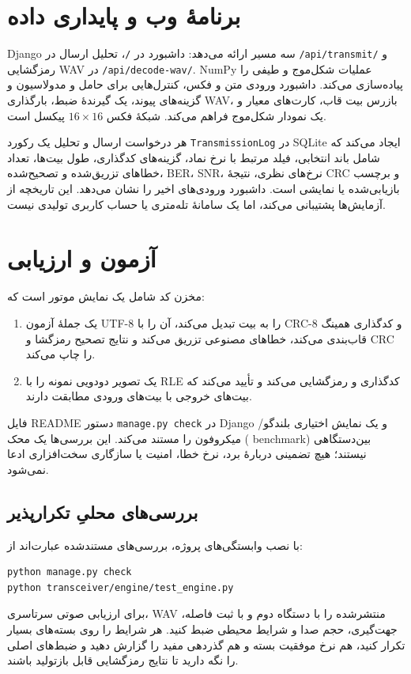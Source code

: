 \documentclass[12pt,a4paper]{article}
\providecommand{\lr}[1]{\foreignlanguage{english}{\begingroup\hyphenchar\font=-1 #1\endgroup}}
\newcommand{\code}[1]{\lr{\texttt{#1}}}
\begin{document}
\section{برنامۀ وب و پایداری داده}
\label{sec:web}

\lr{Django} سه مسیر ارائه می‌دهد: داشبورد در \code{/}، تحلیل ارسال در \code{/api/transmit/} و رمزگشایی \lr{WAV} در \code{/api/decode-wav/}. \lr{NumPy} عملیات شکل‌موج و طیفی را پیاده‌سازی می‌کند. داشبورد ورودی متن و فکس، کنترل‌هایی برای حامل و مدولاسیون و گزینه‌های پیوند، یک گیرندۀ ضبط، بارگذاری \lr{WAV}، بازرس بیت قاب، کارت‌های معیار و یک نمودار شکل‌موج فراهم می‌کند. شبکۀ فکس $16\times16$ پیکسل است.

هر درخواست ارسال و تحلیل یک رکورد \code{TransmissionLog} در \lr{SQLite} ایجاد می‌کند که شامل باند انتخابی، فیلد مرتبط با نرخ نماد، گزینه‌های کدگذاری، طول بیت‌ها، تعداد خطاهای تزریق‌شده و تصحیح‌شده، \lr{BER}، \lr{SNR}، نرخ‌های نظری، نتیجۀ \lr{CRC} و برچسب بازیابی‌شده یا نمایشی است. داشبورد ورودی‌های اخیر را نشان می‌دهد. این تاریخچه از آزمایش‌ها پشتیبانی می‌کند، اما یک سامانۀ تله‌متری یا حساب کاربری تولیدی نیست.

\section{آزمون و ارزیابی}
\label{sec:testing}

مخزن کد شامل یک نمایش موتور است که:
\begin{enumerate}
    \item یک جملۀ آزمون \lr{UTF-8} را به بیت تبدیل می‌کند، آن را با \lr{CRC-8} و کدگذاری همینگ قاب‌بندی می‌کند، خطاهای مصنوعی تزریق می‌کند و نتایج تصحیح رمزگشا و \lr{CRC} را چاپ می‌کند.
    \item یک تصویر دودویی نمونه را با \lr{RLE} کدگذاری و رمزگشایی می‌کند و تأیید می‌کند که بیت‌های خروجی با بیت‌های ورودی مطابقت دارند.
\end{enumerate}
فایل \lr{README} دستور \code{manage.py check} در \lr{Django} و یک نمایش اختیاری بلندگو/میکروفون را مستند می‌کند. این بررسی‌ها یک محک (\lr{benchmark}) بین‌دستگاهی نیستند؛ هیچ تضمینی دربارۀ برد، نرخ خطا، امنیت یا سازگاری سخت‌افزاری ادعا نمی‌شود.

\subsection{بررسی‌های محلیِ تکرارپذیر}
با نصب وابستگی‌های پروژه، بررسی‌های مستندشده عبارت‌اند از:
\begin{otherlanguage}{english}
\begin{lstlisting}[basicstyle=\ttfamily\small,frame=single,backgroundcolor=\color{lightgray}]
python manage.py check
python transceiver/engine/test_engine.py
\end{lstlisting}
\end{otherlanguage}
برای ارزیابی صوتی سرتاسری، \lr{WAV} منتشرشده را با دستگاه دوم و با ثبت فاصله، جهت‌گیری، حجم صدا و شرایط محیطی ضبط کنید. هر شرایط را روی بسته‌های بسیار تکرار کنید، هم نرخ موفقیت بسته و هم گذردهی مفید را گزارش دهید و ضبط‌های اصلی را نگه دارید تا نتایج رمزگشایی قابل بازتولید باشند.
\end{document}
